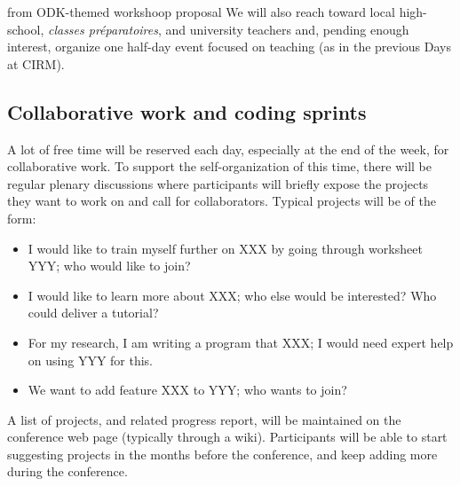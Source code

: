 \begin{oldpart}{from ODK-themed workshoop proposal}
We will also reach toward local high-school, \textit{classes préparatoires},
and university teachers and, pending enough interest, organize one
half-day event focused on teaching (as in the previous \Sage Days at
CIRM).

\subsection{Collaborative work and coding sprints}

A lot of free time will be reserved each day, especially at the end of
the week, for collaborative work. To support the self-organization of
this time, there will be regular plenary discussions where
participants will briefly expose the projects they want to work on and
call for collaborators. Typical projects will be of the form:
\begin{itemize}
\item I would like to train myself further on XXX by going through
  worksheet YYY; who would like to join?
\item I would like to learn more about XXX; who else would be
  interested? Who could deliver a tutorial?
\item For my research, I am writing a program that XXX; I would need
  expert help on using YYY for this.
\item We want to add feature XXX to YYY; who wants to join?
\end{itemize}

A list of projects, and related progress report, will be maintained on
the conference web page (typically through a wiki). Participants will
be able to start suggesting projects in the months before the conference,
and keep adding more during the conference.
\end{oldpart}

